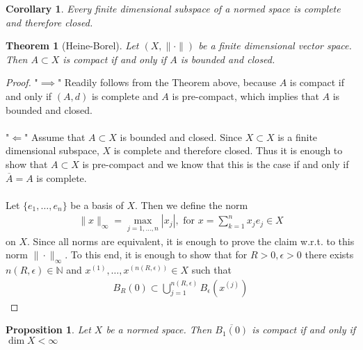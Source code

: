 \documentclass[11pt,a4paper]{article}
\newtheorem{thm}{Theorem}[section]
\newtheorem{prop}{Proposition}[section]
\newtheorem{cor}{Corollary}[section]
\theoremstyle{definition}
\begin{document}
\begin{cor} Every finite dimensional subspace of a normed space is complete and therefore closed. 
\end{cor}
\begin{thm}[Heine-Borel] Let $(X, \| \cdot\|)$ be a finite dimensional vector space. Then $A \subset X$ is compact if and only if $A$ is bounded and closed.  
\end{thm}
\begin{proof}
"$\implies$" Readily follows from the Theorem above, because $A$ is compact if and only if $(A,d)$ is complete and $A$ is pre-compact, which implies that $A$ is bounded and closed. 
\\\\
"$\Longleftarrow$" Assume that $A \subset X$ is bounded and closed. Since $X \subset X$ is a finite dimensional subspace, $X$ is complete and therefore closed. Thus it is enough to show that $A \subset X$ is pre-compact and we know that this is the case if and only if $\overline{A}=A$ is complete. 
\\\\
Let $\lbrace e_1, \dots , e_n \rbrace$ be a basis of $X$. Then we define the norm \begin{align*}
\|x\|_\infty = \max_{j=1, \dots , n} | x_j|, \text{ for } x = \sum_{k=1}^n x_j e_j \in X
\end{align*}
on $X$. Since all norms are equivalent, it is enough to prove the claim w.r.t. to this norm $\| \cdot \|_\infty$. To this end, it is enough to show that for $R>0, \epsilon >0$ there exists $n(R, \epsilon) \in \mathbb{N}$ and $x^{(1)}, \dots , x^{(n(R, \epsilon))} \in X$ such that \begin{align*}
B_R(0) \subset \bigcup_{j=1}^{n(R, \epsilon)} B_\epsilon (x^{(j)}) 
\end{align*}
\end{proof}
\begin{prop} \label{compactunitball} Let $X$ be a normed space. Then $\overline{B_1(0)}$ is compact if and only if $\dim X < \infty$
\end{prop}
\end{document}
